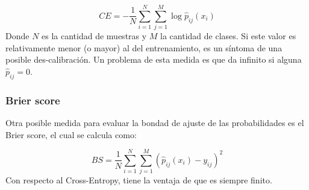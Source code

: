 $$ CE = - \frac{1}{N}\sum _{i=1}^{N} \sum _{j=1}^{M} \log \hat p_{ij}(x_i) $$
Donde $N$ es la cantidad de muestras y $M$ la cantidad de clases. Si este valor
es relativamente menor (o mayor) al del entrenamiento, es un síntoma de una
posible des-calibración. Un problema de esta medida es que da infinito si
alguna $\hat p_{ij} = 0$.

\subsubsection{Brier score}\label{calibracion:Brier score}

Otra posible medida para evaluar la bondad de ajuste de las probabilidades es el
Brier score, el cual se calcula como:

$$ BS = \frac{1}{N}\sum _{i=1}^{N} \sum _{j=1}^{M} (\hat p_{ij}(x_i) - y_{ij})^2
$$ Con respecto al Cross-Entropy, tiene la ventaja de que es siempre finito.
